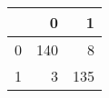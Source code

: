 \begin{tabular}{lrr}
\toprule
{} &    0 &    1 \\
\midrule
0 &  140 &    8 \\
1 &    3 &  135 \\
\bottomrule
\end{tabular}
